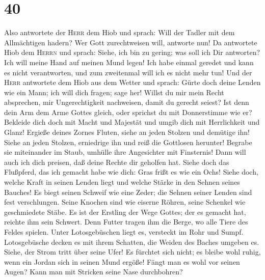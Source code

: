 \hypertarget{section-39}{%
\section{40}\label{section-39}}

 Also antwortete der \textsc{Herr} dem Hiob und sprach:
 Will der Tadler mit dem Allmächtigen hadern? Wer Gott
zurechtweisen will, antworte nun!  Da antwortete Hiob dem
\textsc{Herrn} und sprach:  Siehe, ich bin zu gering; was
soll ich Dir antworten? Ich will meine Hand auf meinen Mund legen!
 Ich habe einmal geredet und kann es nicht verantworten,
und zum zweitenmal will ich es nicht mehr tun!  Und der
\textsc{Herr} antwortete dem Hiob aus dem Wetter und sprach:
 Gürte doch deine Lenden wie ein Mann; ich will dich
fragen; sage her!  Willst du mir mein Recht absprechen,
mir Ungerechtigkeit nachweisen, damit du gerecht seiest? 
Ist denn dein Arm dem Arme Gottes gleich, oder sprichst du mit
Donnerstimme wie er?  Bekleide dich doch mit Macht und
Majestät und umgib dich mit Herrlichkeit und Glanz! 
Ergieße deines Zornes Fluten, siehe an jeden Stolzen und demütige ihn!
 Siehe an jeden Stolzen, erniedrige ihn und reiß die
Gottlosen herunter!  Begrabe sie miteinander im Staub,
umhülle ihre Angesichter mit Finsternis!  Dann will auch
ich dich preisen, daß deine Rechte dir geholfen hat. 
Siehe doch das Flußpferd, das ich gemacht habe wie dich: Gras frißt es
wie ein Ochs!  Siehe doch, welche Kraft in seinen Lenden
liegt und welche Stärke in den Sehnen seines Bauches!  Es
biegt seinen Schweif wie eine Zeder; die Sehnen seiner Lenden sind fest
verschlungen.  Seine Knochen sind wie eiserne Röhren,
seine Schenkel wie geschmiedete Stäbe.  Es ist der
Erstling der Wege Gottes; der es gemacht hat, reichte ihm sein Schwert.
 Denn Futter tragen ihm die Berge, wo alle Tiere des
Feldes spielen.  Unter Lotosgebüschen liegt es, versteckt
im Rohr und Sumpf.  Lotosgebüsche decken es mit ihrem
Schatten, die Weiden des Baches umgeben es.  Siehe, der
Strom tritt über seine Ufer! Es fürchtet sich nicht; es bleibe wohl
ruhig, wenn ein Jordan sich in seinen Mund ergöße!  Fängt
man es wohl vor seinen Augen? Kann man mit Stricken seine Nase
durchbohren?

